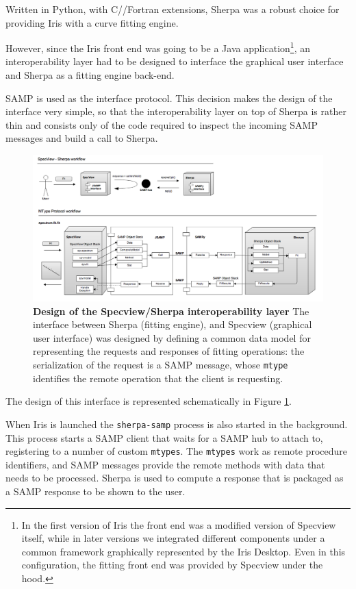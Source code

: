 \documentclass[final,5p,authoryear]{elsarticle}
\begin{document}
Written in Python, with C/\Cpp/Fortran extensions, Sherpa was a robust choice
for providing Iris with a curve fitting engine.

However, since the Iris front end was going to be a Java application\footnote{In
the first version of Iris the front end was a modified version of Specview
itself, while in later versions we integrated different components under a
common framework graphically represented by the Iris Desktop. Even in this
configuration, the fitting front end was provided by Specview under the hood.},
an interoperability layer had to be designed to interface the graphical user
interface and Sherpa as a fitting engine back-end.

SAMP is used as the interface protocol. This decision makes the design of the
interface very simple, so that the interoperability layer on top of Sherpa is
rather thin and consists only of the code required to inspect the incoming SAMP
messages and build a call to Sherpa.

\begin{figure} \begin{center}
\includegraphics[width=\textwidth]{figures/sherpasamp.png}
\caption{\textbf{Design of the Specview/Sherpa interoperability layer} The
interface between Sherpa (fitting engine), and Specview (graphical user
interface) was designed by defining a common data model for representing the
requests and responses of fitting operations: the serialization of the request
is a SAMP message, whose \texttt{mtype} identifies the remote operation that the
client is requesting.} \label{fig:sherpasamp} \end{center} \end{figure}

The design of this interface is represented schematically in Figure
\ref{fig:sherpasamp}.

When Iris is launched the \verb|sherpa-samp| process is also started in the
background. This process starts a SAMP client that waits for a SAMP hub to
attach to, registering to a number of custom
\verb|mtypes|. The \verb|mtypes| work as remote procedure identifiers, and SAMP
messages provide the remote methods with data that needs to be processed. Sherpa
is used to compute a response that is packaged as a
SAMP response to be shown to the user.
\end{document}
